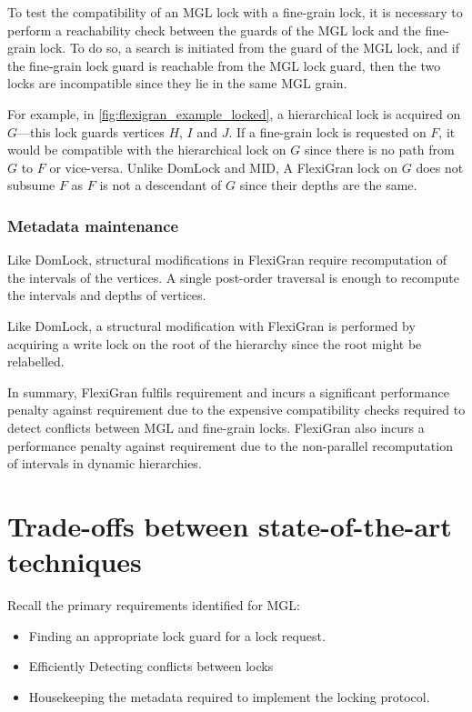 To test the compatibility of an MGL lock with a fine-grain lock, it is necessary to perform a reachability check between the guards of the MGL lock and the fine-grain lock. To do so, a search is initiated from the guard of the MGL lock, and if the fine-grain lock guard is reachable from the MGL lock guard, then the two locks are incompatible since they lie in the same MGL grain. 

For example, in \cref{fig:flexigran_example_locked}, a hierarchical lock is acquired on $G$—this lock guards vertices $H$, $I$ and $J$. If a fine-grain lock is requested on $F$, it would be compatible with the hierarchical lock on $G$ since there is no path from $G$ to $F$ or vice-versa. Unlike DomLock and MID, A FlexiGran lock on $G$ does not subsume $F$ as $F$ is not a descendant of $G$ since their depths are the same.

\subsubsection{Metadata maintenance}

Like DomLock, structural modifications in FlexiGran require recomputation of the intervals of the vertices. A single post-order traversal is enough to recompute the intervals and depths of vertices. 

Like DomLock, a structural modification with FlexiGran is performed by acquiring a write lock on the root of the hierarchy since the root might be relabelled.

In summary, FlexiGran fulfils requirement \Rb and incurs a significant performance penalty against requirement \Rc due to the expensive compatibility checks required to detect conflicts between MGL and fine-grain locks. FlexiGran also incurs a performance penalty against requirement \Rd due to the non-parallel recomputation of intervals in dynamic hierarchies.



\section{Trade-offs between state-of-the-art techniques}

Recall the primary requirements identified for MGL:
\begin{itemize}
    \item[\Rb] Finding an appropriate lock guard for a lock request.
    \item[\Rc] Efficiently Detecting conflicts between locks
    \item[\Rd] Housekeeping the metadata required to implement the locking protocol.
\end{itemize}

